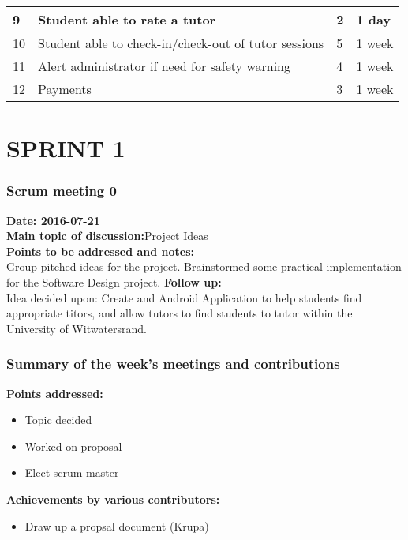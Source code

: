 \documentclass[12pt]{article}
\begin{document}
{\begin{longtable}{| p{1.5cm} | p{8cm}| p{2cm}| p{3cm} |}
				9 & Student able to rate a tutor & 2 & 1 day\\ \hline

				10 & Student able to check-in/check-out of tutor sessions  & 5 & 1 week\\ \hline	

				11 & Alert administrator if need for safety warning  & 4 & 1 week \\ \hline	

				12 & Payments  & 3 & 1 week \\ \hline	



	
\end{longtable}
}
\section{SPRINT 1}
\subsubsection{Scrum meeting 0}
\textbf{Date: 2016-07-21}\\
\textbf{Main topic of discussion:}Project Ideas\\
\textbf{Points to be addressed and notes:}\\
Group pitched ideas for the project. Brainstormed some practical implementation for the Software Design project. 
\textbf{Follow up:}\\
Idea decided upon: Create and Android Application to help students find appropriate titors, and allow tutors to find students to tutor within the University of Witwatersrand. 
\subsubsection{Summary of the week's meetings and contributions}
\textbf{Points addressed:}
\begin{itemize}
\item Topic decided
\item Worked on proposal
\item Elect scrum master
\end{itemize}
\textbf{Achievements by various contributors:}
\begin{itemize}
\item Draw up a propsal document (Krupa)
\end{itemize}

\end{document}
